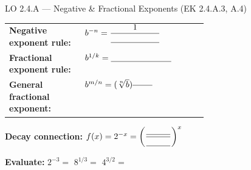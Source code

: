 \documentclass[10pt]{article}
\begin{document}
\begin{notesbox}{LO 2.4.A --- Negative \& Fractional Exponents (EK 2.4.A.3, A.4)}
\renewcommand{\arraystretch}{1.5}
\begin{tabular}{@{} >{\bfseries}p{0.38\linewidth} l @{}}
Negative exponent rule:     & $b^{-n} = \dfrac{1}{\blank{2cm}}$ \\
Fractional exponent rule:   & $b^{1/k} = \blank{2.5cm}$ \\
General fractional exponent: & $b^{m/n} = (\sqrt[n]{b})^{\blank{0.8cm}}$ \\
\end{tabular}

\medskip
\textbf{Decay connection:} $f(x) = 2^{-x} = \left(\dfrac{\blank{1cm}}{\blank{1cm}}\right)^x$

\medskip
\textbf{Evaluate:}
\quad $2^{-3} = $ \blank{2cm}
\quad $8^{1/3} = $ \blank{2cm}
\quad $4^{3/2} = $ \blank{2cm}
\end{notesbox}
\end{document}
